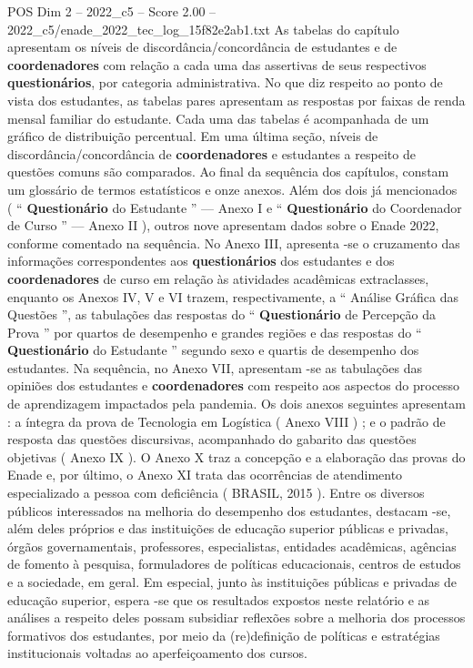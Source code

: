 \begin{textsample}{POS Dim 2 – 2022\_c5 – Score 2.00 – 2022\_c5/enade\_2022\_tec\_log\_15f82e2ab1.txt}
As tabelas do capítulo apresentam os níveis de discordância/concordância de estudantes e de \textbf{coordenadores} com relação a cada uma das assertivas de seus respectivos \textbf{questionários}, por categoria administrativa.
No que diz respeito ao ponto de vista dos estudantes, as tabelas pares apresentam as respostas por faixas de renda mensal familiar do estudante.
Cada uma das tabelas é acompanhada de um gráfico de distribuição percentual.
Em uma última seção, níveis de discordância/concordância de \textbf{coordenadores} e estudantes a respeito de questões comuns são comparados.
Ao final da sequência dos capítulos, constam um glossário de termos estatísticos e onze anexos.
Além dos dois já mencionados ( “ \textbf{Questionário} do Estudante ” — Anexo I e “ \textbf{Questionário} do Coordenador de Curso ” — Anexo II ), outros nove apresentam dados sobre o Enade 2022, conforme comentado na sequência.
No Anexo III, apresenta -se o cruzamento das informações correspondentes aos \textbf{questionários} dos estudantes e dos \textbf{coordenadores} de curso em relação às atividades acadêmicas extraclasses, enquanto os Anexos IV, V e VI trazem, respectivamente, a “ Análise Gráfica das Questões ”, as tabulações das respostas do “ \textbf{Questionário} de Percepção da Prova ” por quartos de desempenho e grandes regiões e das respostas do “ \textbf{Questionário} do Estudante ” segundo sexo e quartis de desempenho dos estudantes.
Na sequência, no Anexo VII, apresentam -se as tabulações das opiniões dos estudantes e \textbf{coordenadores} com respeito aos aspectos do processo de aprendizagem impactados pela pandemia.
Os dois anexos seguintes apresentam : a íntegra da prova de Tecnologia em Logística ( Anexo VIII ) ; e o padrão de resposta das questões discursivas, acompanhado do gabarito das questões objetivas ( Anexo IX ).
O Anexo X traz a concepção e a elaboração das provas do Enade e, por último, o Anexo XI trata das ocorrências de atendimento especializado a pessoa com deficiência ( BRASIL, 2015 ).
Entre os diversos públicos interessados na melhoria do desempenho dos estudantes, destacam -se, além deles próprios e das instituições de educação superior públicas e privadas, órgãos governamentais, professores, especialistas, entidades acadêmicas, agências de fomento à pesquisa, formuladores de políticas educacionais, centros de estudos e a sociedade, em geral.
Em especial, junto às instituições públicas e privadas de educação superior, espera -se que os resultados expostos neste relatório e as análises a respeito deles possam subsidiar reflexões sobre a melhoria dos processos formativos dos estudantes, por meio da (re)definição de políticas e estratégias institucionais voltadas ao aperfeiçoamento dos cursos.

\end{textsample}
